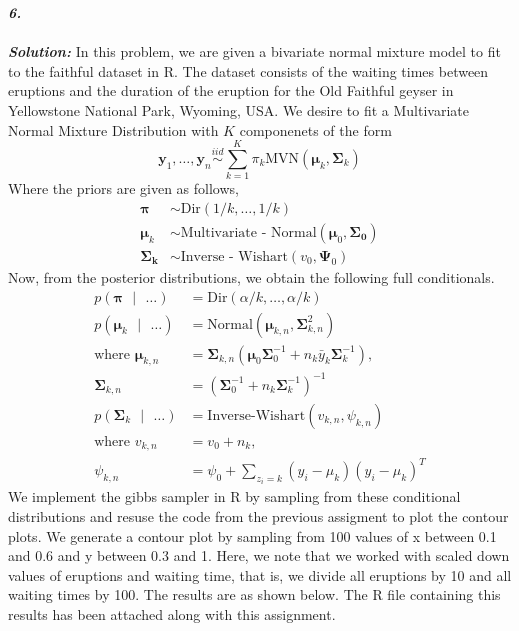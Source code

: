 \documentclass[11pt]{article}
\begin{document}
\noindent \textbf{\emph{6.}}\\ \\
\textbf{\emph{Solution:}} In this problem, we are given a bivariate normal mixture model to fit to the faithful dataset in R. The dataset consists of the waiting times between eruptions and the duration of the eruption for the Old Faithful geyser in Yellowstone National Park, Wyoming, USA. We desire to fit a Multivariate Normal Mixture Distribution with $K$ componenets of the form
\begin{equation}
  \nonumber
  \mathbf{y}_{1}, \dots, \mathbf{y}_{n} \overset{iid}{\sim} \sum_{k = 1}^{K} \pi_{k}\text{MVN}(\bm{\mu}_{k}, \bm{\Sigma}_{k})
\end{equation}
Where the priors are given as follows,
\begin{equation}
  \nonumber
  \begin{aligned}
    \bm{\pi} & \sim \text{Dir}(1/k,\dots,1/k)\\
    \bm{\mu}_k & \sim \text{Multivariate - Normal}(\bm{\mu}_{0}, \bm{\Sigma_{0}})\\
    \bm{\Sigma_{k}} & \sim \text{Inverse - Wishart}(v_{0}, \bm{\Psi}_{0})
  \end{aligned}
\end{equation}
Now, from the posterior distributions, we obtain the following full conditionals.
\begin{equation}
  \nonumber
  \begin{aligned}
    p(\bm{\pi} \text{ } | \text{ } \dots) & = \text{Dir}(\alpha/k,\dots,\alpha/k)\\
    p(\bm{\mu}_k \text{ } | \text{ } \dots) & = \text{Normal}(\bm{\mu}_{k,n}, \bm{\Sigma}_{k,n}^2)\\
    \text{where }\bm{\mu}_{k,n} & = \bm{\Sigma}_{k,n}(\bm{\mu}_0\bm{\Sigma}_{0}^{-1} + n_k\bar{y}_k\bm{\Sigma}_{k}^{-1}),\\
    \bm{\Sigma}_{k,n} & = (\bm{\Sigma}_{0}^{-1} + n_k\bm{\Sigma}_{k}^{-1})^{-1}\\
    p(\bm{\Sigma}_{k} \text{ }|\text{ } \dots) & = \text{Inverse-Wishart}(v_{k,n}, \psi_{k,n})\\
    \text{where } v_{k,n} & = v_0 + n_k, \\
    \psi_{k,n} &= \psi_0 + \sum_{z_{i} = k}(y_i-\mu_k)(y_i-\mu_k)^{T}
  \end{aligned}
\end{equation}
We implement the gibbs sampler in R by sampling from these conditional distributions and resuse the code from the previous assigment to plot the contour plots. We generate a contour plot by sampling from 100 values of x between 0.1 and 0.6 and y between 0.3 and 1. Here, we note that we worked with scaled down values of eruptions and waiting time, that is, we divide all eruptions by 10 and all waiting times by 100. The results are as shown below. The R file containing this results has been attached along with this assignment.
\end{document}
